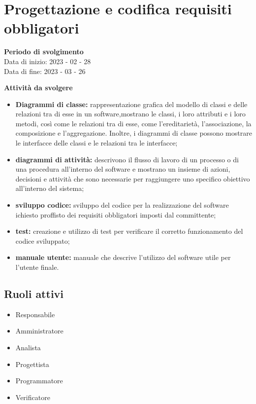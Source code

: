 \section{Progettazione e codifica requisiti obbligatori}

\textbf{Periodo di svolgimento}
\\ Data di inizio: 2023 - 02 - 28 \\ Data di fine: 2023 - 03 - 26

\textbf{Attività da svolgere}
    \begin{itemize}
        \item \textbf{Diagrammi di classe:} rappresentazione grafica del modello di classi e delle relazioni tra di esse in un software,mostrano le classi, i loro attributi e i loro metodi, così come le relazioni tra di esse, come l'ereditarietà, l'associazione, la composizione e l'aggregazione. Inoltre, i diagrammi di classe possono mostrare le interfacce delle classi e le relazioni tra le interfacce; 
        \item \textbf{diagrammi di attività:} descrivono il flusso di lavoro di un processo o di una procedura all'interno del software e mostrano un insieme di azioni, decisioni e attività che sono necessarie per raggiungere uno specifico obiettivo all'interno del sistema;
        \item \textbf{sviluppo codice:} sviluppo del codice per la realizzazione del software ichiesto proffisto dei requisiti obbligatori imposti dal committente;
        \item \textbf{test:} creazione e utilizzo di test per verificare il corretto funzionamento del codice sviluppato;
        \item \textbf{manuale utente:} manuale che descrive l'utilizzo del software utile per l'utente finale.
    \end{itemize}

\subsection{Ruoli attivi}
\begin{itemize}
    \item Responsabile 
    \item Amministratore
    \item Analista
    \item Progettista 
    \item Programmatore 
    \item Verificatore 
\end{itemize}

